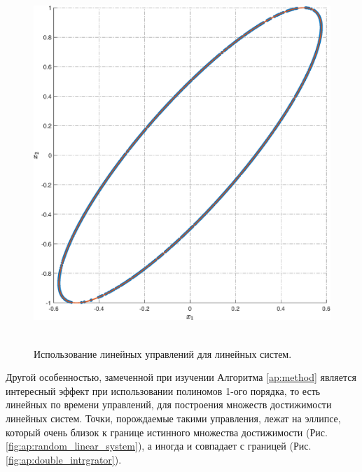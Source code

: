 \documentclass[../main.tex]{subfiles}
\begin{document}
\begin{figure}[ht!]
\begin{minipage}[b]{.4\linewidth}
  		\includegraphics[width=\linewidth]{images/double_integrator_linear_control.eps}
  		 \label{fig:ap:double_intrgrator} 
  	\end{minipage} 
  	\caption{Использование линейных управлений для линейных систем.}\label{fig:ap:linear_control}
  \end{figure}
  
  Другой особенностью, замеченной при изучении Алгоритма \ref{ap:method} является интересный эффект при использовании полиномов 1-ого порядка, то есть линейных по времени управлений, для построения множеств достижимости линейных систем.
  Точки, порождаемые такими управления, лежат на эллипсе, который очень близок к границе истинного множества достижимости (Рис.  \ref{fig:ap:random_linear_system}), а иногда и совпадает с границей (Рис. \ref{fig:ap:double_intrgrator}). 
  
\end{document}

